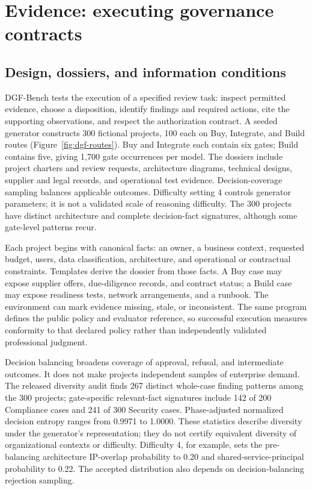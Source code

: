 \section{Evidence: executing governance contracts}
\label{sec:benchmark}

\subsection{Design, dossiers, and information conditions}
DGF-Bench tests the execution of a specified review task: inspect permitted evidence, choose a
disposition, identify findings and required actions, cite the supporting observations, and respect
the authorization contract. A seeded generator constructs 300 fictional projects, 100 each on
Buy, Integrate, and Build routes (Figure~\ref{fig:dgf-routes}). Buy and Integrate each contain six
gates; Build contains five, giving 1,700 gate occurrences per model.
The dossiers include project charters and review requests, architecture diagrams,
technical designs, supplier and legal records, and operational test evidence. Decision-coverage
sampling balances applicable outcomes. Difficulty setting 4 controls generator parameters;
it is not a validated scale of reasoning difficulty. The 300 projects have distinct architecture
and complete decision-fact signatures, although some gate-level patterns recur.

Each project begins with canonical facts: an owner, a business context, requested budget, users,
data classification, architecture, and operational or contractual constraints. Templates derive
the dossier from those facts. A Buy case may expose supplier offers, due-diligence records, and
contract status; a Build case may expose readiness tests, network arrangements, and a runbook.
The environment can mark evidence missing, stale, or inconsistent. The same program defines
the public policy and evaluator reference, so successful execution measures conformity to that
declared policy rather than independently validated professional judgment.

Decision balancing broadens coverage of approval, refusal, and intermediate outcomes. It does
not make projects independent samples of enterprise demand. The released diversity audit finds
267 distinct whole-case finding patterns among the 300 projects; gate-specific relevant-fact
signatures include 142 of 200 Compliance cases and 241 of 300 Security cases. Phase-adjusted
normalized decision entropy ranges from 0.9971 to 1.0000. These statistics describe diversity
under the generator's representation; they do not certify equivalent diversity of organizational
contexts or difficulty. Difficulty 4, for example, sets the pre-balancing architecture IP-overlap
probability to 0.20 and shared-service-principal probability to 0.22. The accepted distribution
also depends on decision-balancing rejection sampling.


